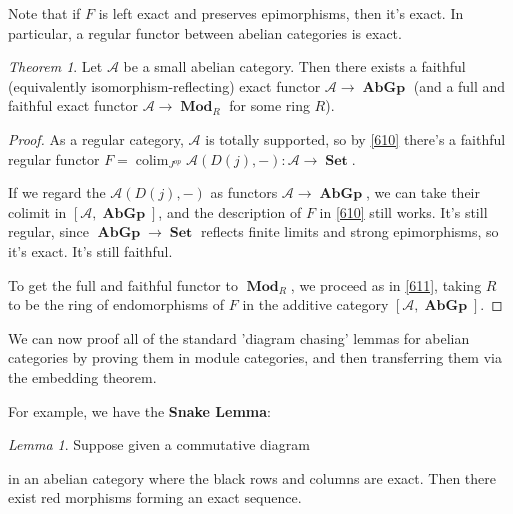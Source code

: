 \documentclass[a4paper]{article}
\theoremstyle{definition}
\theoremstyle{remark}
\theoremstyle{default}
\newtheorem{lemma}[definition]{Lemma}
\newtheorem{theorem}[definition]{Theorem}
\numberwithin{definition}{section}
\DeclareMathOperator{\Set}{\textbf{Set}}
\DeclareMathOperator{\AbGp}{\textbf{AbGp}}
\DeclareMathOperator{\Mod}{\textbf{Mod}}
\DeclareMathOperator{\colim}{colim}
\begin{document}
Note that if $F$ is left exact and preserves epimorphisms, then it's exact.
In particular, a regular functor between abelian categories is exact.

\begin{theorem}
	Let $\mathcal{A}$ be a small abelian category.
	Then there exists a faithful (equivalently isomorphism-reflecting) exact functor $\mathcal{A} \to \AbGp$
	(and a full and faithful exact functor $\mathcal{A} \to \Mod_R$ for some ring $R$).
\end{theorem}
\begin{proof}
	As a regular category,
	$\mathcal{A}$ is totally supported,
	so by \ref{610} there's a faithful regular functor $F = \colim_{J^{op}} \mathcal{A}(D(j), -): \mathcal{A} \to \Set$.
	
	If we regard the $\mathcal{A}(D(j), -)$ as functors $\mathcal{A} \to \AbGp$,
	we can take their colimit in $[\mathcal{A}, \AbGp]$,
	and the description of $F$ in \ref{610} still works.
	It's still regular,
	since $\AbGp \to \Set$ reflects finite limits and strong epimorphisms,
	so it's exact.
	It's still faithful.
	
	To get the full and faithful functor to $\Mod_R$,
	we proceed as in \ref{611},
	taking $R$ to be the ring of endomorphisms of $F$ in the additive category $[\mathcal{A}, \AbGp]$.
\end{proof}

We can now proof all of the standard 'diagram chasing' lemmas for abelian categories by proving them in module categories,
and then transferring them via the embedding theorem.

For example, we have the \textbf{Snake Lemma}:

\begin{lemma}
	Suppose given a commutative diagram
	\begin{center}
	\end{center}
	in an abelian category where the black rows and columns are exact.
	Then there exist red morphisms forming an exact sequence.
\end{lemma}
\end{document}
